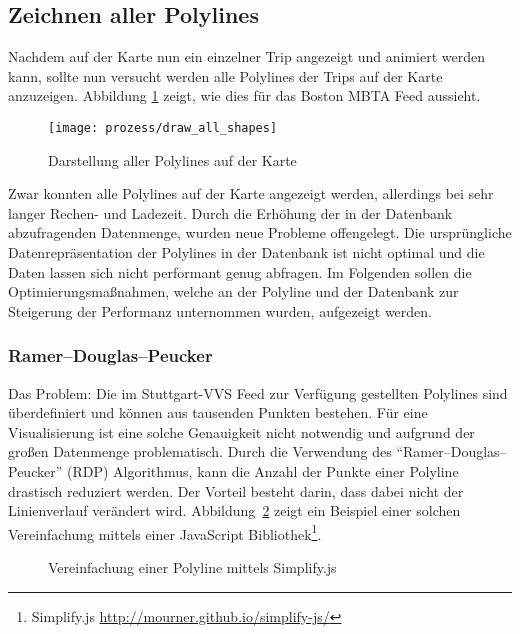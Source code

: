\subsection{Zeichnen aller Polylines}
\label{sub:zeichnen_aller_polylines}
  Nachdem auf der Karte nun ein einzelner Trip angezeigt und animiert werden kann, sollte nun versucht werden alle Polylines der Trips auf der Karte anzuzeigen. Abbildung \ref{fig:prozess/draw_all_shapes} zeigt, wie dies für das Boston MBTA Feed aussieht.

  \begin{figure}[htbp]
    \begin{center}
      \texttt{[image: prozess/draw\_all\_shapes]}
      \caption{Darstellung aller Polylines auf der Karte}
      \label{fig:prozess/draw_all_shapes}
    \end{center}
  \end{figure}
  
  Zwar konnten alle Polylines auf der Karte angezeigt werden, allerdings bei sehr langer Rechen- und Ladezeit. Durch die Erhöhung der in der Datenbank abzufragenden Datenmenge, wurden neue Probleme offengelegt. Die ursprüngliche Datenrepräsentation der Polylines in der Datenbank ist nicht optimal und die Daten lassen sich nicht performant genug abfragen. Im Folgenden sollen die Optimierungsmaßnahmen, welche an der Polyline und der Datenbank zur Steigerung der Performanz unternommen wurden, aufgezeigt werden.

  \subsubsection{Ramer–Douglas–Peucker}
  \label{ssub:ramer_douglas_peucker}
    Das Problem: Die im Stuttgart-VVS Feed zur Verfügung gestellten Polylines sind überdefiniert und können aus tausenden Punkten bestehen. Für eine Visualisierung ist eine solche Genauigkeit nicht notwendig und aufgrund der großen Datenmenge problematisch. Durch die Verwendung des "`Ramer–Douglas–Peucker"' (RDP) Algorithmus, kann die Anzahl der Punkte einer Polyline drastisch reduziert werden. Der Vorteil besteht darin, dass dabei nicht der Linienverlauf verändert wird. Abbildung~\ref{fig:simplify} zeigt ein Beispiel einer solchen Vereinfachung mittels einer JavaScript Bibliothek\footnote{Simplify.js \url{http://mourner.github.io/simplify-js/}}.

    \begin{figure}[htbp]
      \centering
      \hfill
      \caption{Vereinfachung einer Polyline mittels Simplify.js}
      \label{fig:simplify}
    \end{figure}

